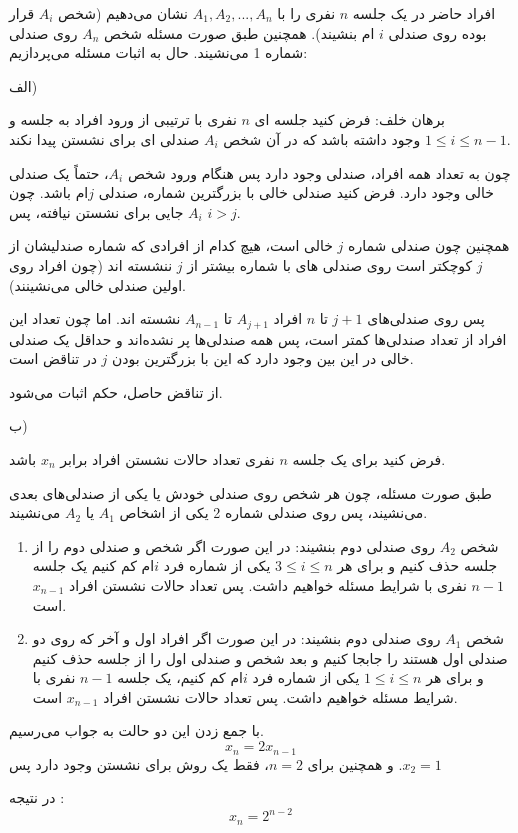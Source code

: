 \p
    افراد حاضر در یک جلسه $n$ نفری را با $A_1, A_2, ... , A_n$ نشان می‌دهیم (شخص $A_i$ قرار بوده روی صندلی $i$ ام بنشیند). همچنین طبق صورت مسئله شخص $A_n$ روی صندلی شماره 1 می‌نشیند. حال به اثبات مسئله می‌پردازیم:
    
    الف) 
    
    برهان خلف: فرض کنید جلسه ای $n$ نفری با ترتیبی از ورود افراد به جلسه و  $1\leq i \leq n-1$ وجود داشته باشد که در آن شخص $A_i$ صندلی ای برای نشستن پیدا نکند. 
    
    چون به تعداد همه افراد، صندلی وجود دارد پس هنگام ورود شخص $A_i$، حتماً یک صندلی خالی وجود دارد. فرض کنید صندلی خالی با بزرگترین شماره، صندلی $j$ام باشد. چون $A_i$ جایی برای نشستن نیافته، پس $i > j$. 
    
    همچنین چون صندلی شماره $j$ خالی است، هیچ کدام از افرادی که شماره صندلیشان از $j$ کوچکتر است روی صندلی های با شماره بیشتر از $j$ ننشسته اند (چون افراد روی اولین صندلی خالی می‌نشینند). 
    
    پس روی صندلی‌های $j+1$ تا $n$ افراد $A_{j+1}$ تا $A_{n-1}$ نشسته اند. اما چون تعداد این افراد از تعداد صندلی‌ها کمتر است، پس همه صندلی‌ها پر نشده‌اند و حداقل یک صندلی خالی در این بین وجود دارد که این با بزرگترین بودن $j$ در تناقض است. 
    
    از تناقض حاصل، حکم اثبات می‌شود.
    
    ب)
    
    فرض کنید برای یک جلسه $n$ نفری تعداد حالات نشستن افراد برابر $x_n$ باشد. 
    
    طبق صورت مسئله، چون هر شخص روی صندلی خودش یا یکی از صندلی‌های بعدی می‌نشیند، پس روی صندلی شماره 2 یکی از اشخاص $A_1$ یا $A_2$ می‌نشیند.  
    
    \begin{enumerate}
        \item
        شخص $A_2$ روی صندلی دوم بنشیند: در این صورت اگر شخص و صندلی دوم را از جلسه حذف کنیم و برای هر $3 \leq i \leq n$ یکی از شماره فرد $i$ام کم کنیم یک جلسه $n-1$ نفری با شرایط مسئله خواهیم داشت. پس تعداد حالات نشستن افراد $x_{n-1}$ است.
        \item
        شخص $A_1$ روی صندلی دوم بنشیند: در این صورت اگر افراد اول و آخر که روی دو صندلی اول هستند را جابجا کنیم و بعد شخص و صندلی اول را از جلسه حذف کنیم و برای هر $1 \leq i \leq n$ یکی از شماره فرد $i$ام کم کنیم، یک جلسه $n-1$ نفری با شرایط مسئله خواهیم داشت. پس تعداد حالات نشستن افراد $x_{n-1}$ است.
    \end{enumerate}
    با جمع زدن این دو حالت به جواب می‌رسیم.
    $$x_n = 2x_{n-1}$$
    و همچنین برای $n=2$، فقط یک روش برای نشستن وجود دارد پس $.x_2 =1$
    
    در نتیجه :
    $$x_n=2^{n-2}$$
